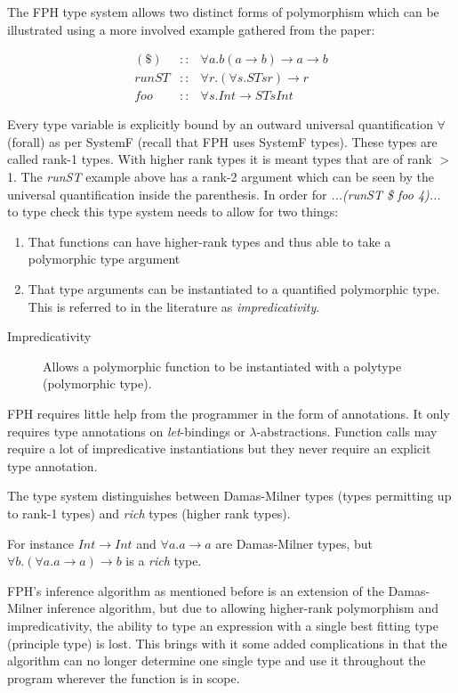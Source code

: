 \documentclass[twoside, titlepage, openright, a4paper]{book}
\begin{document}
The FPH type system allows two distinct forms of polymorphism which can be illustrated using a more involved example gathered from the paper\cite{FPH}:

\begin{eqnarray*}
(\$)  &::& \forall a. b (a\rightarrow b) \rightarrow a \rightarrow b\\
runST &::& \forall r. (\forall s. ST s r) \rightarrow r\\
foo   &::& \forall s. Int \rightarrow ST s Int
\end{eqnarray*}

Every type variable is explicitly bound by an outward universal quantification $\forall$ (forall) as per SystemF (recall that FPH uses SystemF types). These types are called rank-1 types. With higher rank types it is meant types that are of rank $>$ 1.
The \textit{runST} example above has a rank-2 argument which can be seen by the universal quantification inside the parenthesis.
In order for \textit{...(runST \$ foo 4)...} to type check this type system needs to allow for two things:
\begin{enumerate}
\item That functions can have higher-rank types and thus able to take a polymorphic type argument
\item That type arguments can be instantiated to a quantified polymorphic type. This is referred to in the literature as \textit{impredicativity}.
\end{enumerate}

\begin{description}
\item[Impredicativity] Allows a polymorphic function to be instantiated with a polytype (polymorphic type). 
\end{description}

FPH requires little help from the programmer in the form of annotations. It only requires type annotations on \textit{let}-bindings or $\lambda$-abstractions. Function calls may require a lot of impredicative instantiations but they never require an explicit type annotation.

The type system distinguishes between Damas-Milner types (types permitting up to rank-1 types) and \textit{rich} types (higher rank types).

For instance $Int \rightarrow Int$ and $\forall a. a \rightarrow a$ are Damas-Milner types, but $\forall b.(\forall a. a \rightarrow a) \rightarrow b$ is a \textit{rich} type.

FPH's inference algorithm as mentioned before is an extension of the Damas-Milner inference algorithm, but due to allowing higher-rank polymorphism and impredicativity, the ability to type an expression with a single best fitting type (principle type) is lost. This brings with it some added complications in that the algorithm can no longer determine one single type and use it throughout the program wherever the function is in scope.
\end{document}

